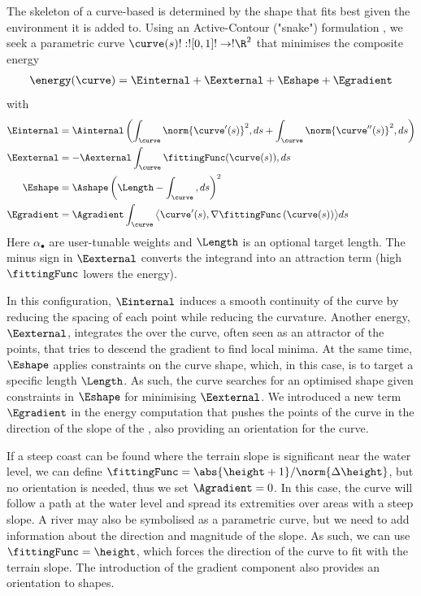 The skeleton of a curve-based  is determined by the shape that fits best given the environment it is added to.
Using an Active-Contour ("snake") formulation \cite{Kass1988}, we seek a parametric curve $\curve(s)!:![0,1]!\to!\R^{2}$ that minimises the composite energy
\begin{align}
\energy(\curve) = \Einternal + \Eexternal + \Eshape + \Egradient
\end{align}
with
\begin{align}
\label{eq:env-obj-snake-energy-equation-internal}
\Einternal &= \Ainternal \left( \int_{\curve}{ \norm{\curve'(s)}^2 , ds} + \int_{\curve}{ \norm{\curve''(s)}^2 , ds} \right) \\
\label{eq:env-obj-snake-energy-equation-external}
\Eexternal &= -\Aexternal \int_{\curve}{ \fittingFunc(\curve(s)) , ds } \\
\label{eq:env-obj-snake-energy-equation-shape}
\Eshape &= \Ashape \left( \Length - \int_{\curve}{ , ds } \right)^2 \\
\label{eq:env-obj-snake-energy-equation-gradient}
\Egradient &= \Agradient \int_{\curve}{\bigl\langle \curve'(s),\nabla\fittingFunc\left(\curve(s)\right)\bigr\rangle ds}
\end{align}
Here $\alpha_{\bullet}$ are user-tunable weights and $\Length$ is an optional target length. The minus sign in $\Eexternal$ converts the integrand into an attraction term (high $\fittingFunc$ lowers the energy).

In this configuration, $\Einternal$ induces a smooth continuity of the curve by reducing the spacing of each point while reducing the curvature. Another energy, $\Eexternal$, integrates the  over the curve, often seen as an attractor of the points, that tries to descend the gradient to find local minima. At the same time, $\Eshape$ applies constraints on the curve shape, which, in this case, is to target a specific length $\Length$. As such, the curve searches for an optimised shape given constraints in $\Eshape$ for minimising $\Eexternal$. We introduced a new term $\Egradient$ in the energy computation that pushes the points of the curve in the direction of the slope of the , also providing an orientation for the curve.

If a steep coast can be found where the terrain slope is significant near the water level, we can define $\fittingFunc = \abs{\height + 1} / \norm{\Delta \height}$, but no orientation is needed, thus we set $\Agradient = 0$. In this case, the curve will follow a path at the water level and spread its extremities over areas with a steep slope. A river may also be symbolised as a parametric curve, but we need to add information about the direction and magnitude of the slope. As such, we can use $\fittingFunc = \height$, which forces the direction of the curve to fit with the terrain slope. The introduction of the gradient component also provides an orientation to shapes.


